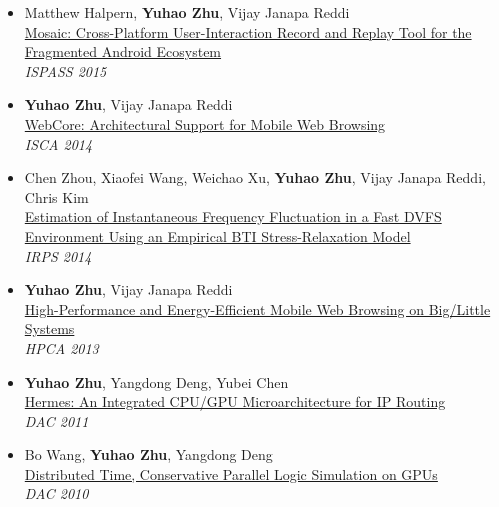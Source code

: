\documentclass[margin, 9pt]{res} %
\begin{document}
\begin{resume}
\begin{itemize}[leftmargin=*]
	\item Matthew Halpern, \textbf{Yuhao Zhu}, Vijay Janapa Reddi\\
          \href{http://yuhaozhu.com/pubs/ispass15.pdf}{Mosaic: Cross-Platform User-Interaction Record and Replay Tool for the Fragmented Android Ecosystem}\\
          \textit{ISPASS 2015}

	\item \textbf{Yuhao Zhu}, Vijay Janapa Reddi\\
          \href{http://yuhaozhu.com/pubs/isca14.pdf}{WebCore: Architectural Support for Mobile Web Browsing}\\
          \textit{ISCA 2014}

	\item Chen Zhou, Xiaofei Wang, Weichao Xu, \textbf{Yuhao Zhu}, Vijay Janapa Reddi, Chris Kim\\
          \href{http://yuhaozhu.com/pubs/irps14.pdf}{Estimation of Instantaneous Frequency Fluctuation in a Fast DVFS Environment Using an Empirical BTI Stress-Relaxation Model}\\
          \textit{IRPS 2014}

	\item \textbf{Yuhao Zhu}, Vijay Janapa Reddi\\
          \href{http://yuhaozhu.com/pubs/hpca13.pdf}{High-Performance and Energy-Efficient Mobile Web Browsing on Big/Little Systems}\\
          \textit{HPCA 2013}

	\item \textbf{Yuhao Zhu}, Yangdong Deng, Yubei Chen\\
          \href{http://yuhaozhu.com/pubs/dac11.pdf}{Hermes: An Integrated CPU/GPU Microarchitecture for IP Routing}\\
          \textit{DAC 2011}

	\item Bo Wang, \textbf{Yuhao Zhu}, Yangdong Deng\\
          \href{http://yuhaozhu.com/pubs/dac10.pdf}{Distributed Time, Conservative Parallel Logic Simulation on GPUs}\\
          \textit{DAC 2010}
\end{itemize}
 


\end{resume}
\end{document}
